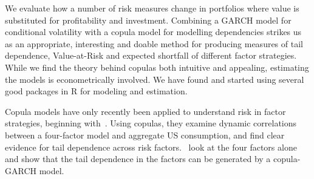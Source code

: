 \documentclass[a4paper,11pt]{article}
\begin{document}
We evaluate how a number of risk measures change in portfolios where value is substituted for profitability and investment. Combining a GARCH model for conditional volatility with a copula model for modelling dependencies strikes us as an appropriate, interesting and doable method for producing measures of tail dependence, Value-at-Risk and expected shortfall of different factor strategies. While we find the theory behind copulas both intuitive and appealing, estimating the models is econometrically involved. We have found and started using several good packages in R for modeling and estimation.

Copula models have only recently been applied to understand risk in factor strategies, beginning with~\textcite{CholleteNing2012}. Using copulas, they examine dynamic correlations between a four-factor model and aggregate US consumption, and find clear evidence for tail dependence across risk factors. \textcite{ChristoffersenLanglois2011}~look at the four factors alone and show that the tail dependence in the factors can be generated by a copula-GARCH model.
\printbibliography
\end{document}
